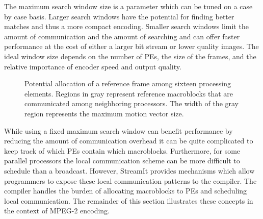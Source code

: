 The maximum search window size is a parameter which can be tuned on a
case by case basis.  Larger search windows have the potential for
finding better matches and thus a more compact encoding.  Smaller
search windows limit the amount of communication and the amount of
searching and can offer faster performance at the cost of either a
larger bit stream or lower quality images.  The ideal window size
depends on the number of PEs, the size of the frames, and the relative
importance of encoder speed and output quality.

\begin{figure}[htbp]
\centerline{}
\caption{Potential allocation of a reference frame among sixteen
processing elements.  Regions in gray represent reference macroblocks
that are communicated among neighboring processors.  The width of the
gray region represents the maximum motion vector size.}
\label{fig:mb_alloc}
\end{figure}

While using a fixed maximum search window can benefit performance by
reducing the amount of communication overhead it can be quite
complicated to keep track of which PEs contain which macroblocks.
Furthermore, for some parallel processors the local communication
scheme can be more difficult to schedule than a broadcast.  However,
StreamIt provides mechanisms which allow programmers to expose these
local communication patterns to the compiler.  The compiler handles
the burden of allocating macroblocks to PEs and scheduling local
communication. The remainder of this section illustrates these
concepts in the context of MPEG-2 encoding.
